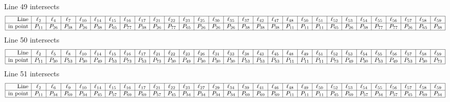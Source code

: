 \documentclass{article}
\begin{document}
{$$$$
Line 49 intersects 
$$
\begin{array}{|r*{28}{|c}|}
\hline
\mbox{Line}  & \ell_{2} & \ell_{4} & \ell_{7} & \ell_{10} & \ell_{14} & \ell_{15} & \ell_{16} & \ell_{17} & \ell_{21} & \ell_{22} & \ell_{23} & \ell_{25} & \ell_{30} & \ell_{35} & \ell_{37} & \ell_{42} & \ell_{47} & \ell_{48} & \ell_{50} & \ell_{51} & \ell_{52} & \ell_{53} & \ell_{54} & \ell_{55} & \ell_{56} & \ell_{57} & \ell_{58} & \ell_{59}\\
\hline
\mbox{in point}  & P_{11} & P_{26} & P_{38} & P_{26} & P_{38} & P_{65} & P_{77} & P_{38} & P_{26} & P_{77} & P_{65} & P_{26} & P_{26} & P_{26} & P_{38} & P_{38} & P_{38} & P_{11} & P_{11} & P_{11} & P_{65} & P_{26} & P_{38} & P_{77} & P_{77} & P_{26} & P_{65} & P_{38}\\
\hline
\end{array}
$$
Line 50 intersects 
$$
\begin{array}{|r*{28}{|c}|}
\hline
\mbox{Line}  & \ell_{2} & \ell_{5} & \ell_{8} & \ell_{10} & \ell_{14} & \ell_{15} & \ell_{16} & \ell_{17} & \ell_{21} & \ell_{22} & \ell_{23} & \ell_{26} & \ell_{31} & \ell_{33} & \ell_{38} & \ell_{43} & \ell_{45} & \ell_{48} & \ell_{49} & \ell_{51} & \ell_{52} & \ell_{53} & \ell_{54} & \ell_{55} & \ell_{56} & \ell_{57} & \ell_{58} & \ell_{59}\\
\hline
\mbox{in point}  & P_{11} & P_{30} & P_{53} & P_{30} & P_{49} & P_{53} & P_{73} & P_{53} & P_{73} & P_{30} & P_{49} & P_{30} & P_{30} & P_{30} & P_{53} & P_{53} & P_{53} & P_{11} & P_{11} & P_{11} & P_{73} & P_{49} & P_{30} & P_{53} & P_{49} & P_{53} & P_{30} & P_{73}\\
\hline
\end{array}
$$
Line 51 intersects 
$$
\begin{array}{|r*{28}{|c}|}
\hline
\mbox{Line}  & \ell_{2} & \ell_{6} & \ell_{9} & \ell_{10} & \ell_{14} & \ell_{15} & \ell_{16} & \ell_{17} & \ell_{21} & \ell_{22} & \ell_{23} & \ell_{27} & \ell_{29} & \ell_{34} & \ell_{39} & \ell_{41} & \ell_{46} & \ell_{48} & \ell_{49} & \ell_{50} & \ell_{52} & \ell_{53} & \ell_{54} & \ell_{55} & \ell_{56} & \ell_{57} & \ell_{58} & \ell_{59}\\
\hline
\mbox{in point}  & P_{11} & P_{34} & P_{69} & P_{34} & P_{45} & P_{57} & P_{69} & P_{69} & P_{57} & P_{45} & P_{34} & P_{34} & P_{34} & P_{34} & P_{69} & P_{69} & P_{69} & P_{11} & P_{11} & P_{11} & P_{45} & P_{69} & P_{57} & P_{34} & P_{57} & P_{45} & P_{69} & P_{34}\\
\hline
\end{array}
$$
}
\end{document}
